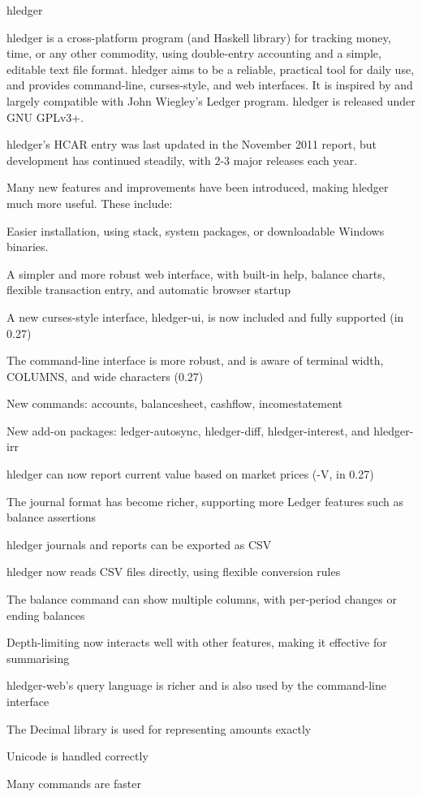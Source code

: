 \documentclass[DIV16,twocolumn,10pt]{scrreprt}
\begin{document}
\begin{hcarentry}{hledger}
\makeheader


hledger is a cross-platform program (and Haskell library) for tracking
money, time, or any other commodity, using double-entry accounting and
a simple, editable text file format.  
hledger aims to be a reliable, practical tool for daily use,
and provides command-line, curses-style, and web interfaces.
It is inspired by and largely compatible with John Wiegley's Ledger program.  
hledger is released under GNU GPLv3+.


hledger's HCAR entry was last updated in the November 2011 report, but
development has continued steadily, with 2-3 major releases each year.

Many new features and improvements have been introduced, making hledger much more useful.
These include:
\begin{compactitem}
\item Easier installation, using stack, system packages, or downloadable Windows binaries.
\item A simpler and more robust web interface, with built-in help, balance charts, flexible transaction entry, and automatic browser startup
\item A new curses-style interface, hledger-ui, is now included and fully supported (in 0.27)
\item The command-line interface is more robust, and is aware of terminal width, COLUMNS, and wide characters (0.27)
\item New commands: accounts, balancesheet, cashflow, incomestatement
\item New add-on packages: ledger-autosync, hledger-diff, hledger-interest, and hledger-irr
\item hledger can now report current value based on market prices (-V, in 0.27)
\item The journal format has become richer, supporting more Ledger features such as balance assertions
\item hledger journals and reports can be exported as CSV
\item hledger now reads CSV files directly, using flexible conversion rules
\item The balance command can show multiple columns, with per-period changes or ending balances
\item Depth-limiting now interacts well with other features, making it effective for summarising
\item hledger-web's query language is richer and is also used by the command-line interface
\item The Decimal library is used for representing amounts exactly
\item Unicode is handled correctly
\item Many commands are faster
\end{compactitem}


\end{hcarentry}
\end{document}
